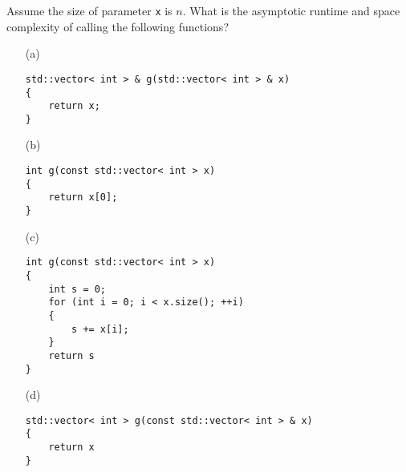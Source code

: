 
Assume the size of parameter \verb!x! is $n$.
What is the asymptotic runtime and space complexity
of calling the following functions?

\begin{enumerate}
\item[(a)]
\begin{Verbatim}[frame=single, fontsize=\small]
std::vector< int > & g(std::vector< int > & x)
{
    return x;
}
\end{Verbatim}
\item[(b)]
\begin{Verbatim}[frame=single, fontsize=\small]
int g(const std::vector< int > x)
{
    return x[0];
}
\end{Verbatim}
\item[(c)]
\begin{Verbatim}[frame=single, fontsize=\small]
int g(const std::vector< int > x)
{
    int s = 0;
    for (int i = 0; i < x.size(); ++i)
    {
        s += x[i];
    }
    return s
}
\end{Verbatim}
\item[(d)]
\begin{Verbatim}[frame=single, fontsize=\small]
std::vector< int > g(const std::vector< int > & x)
{
    return x
}
\end{Verbatim}
\end{enumerate}
